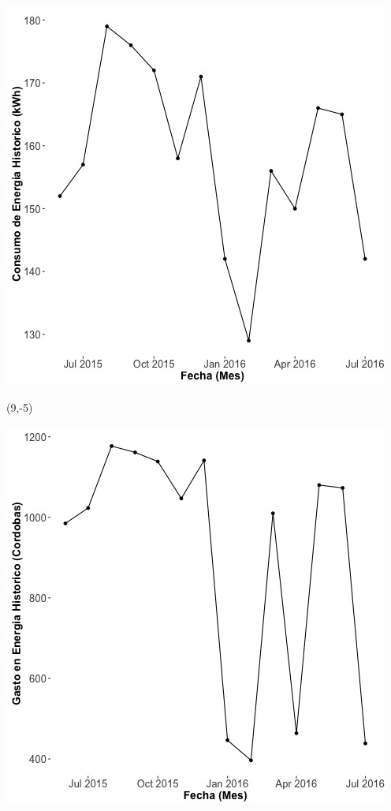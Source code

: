 \documentclass{article}\usepackage[]{graphicx}\usepackage[]{color}
\newenvironment{knitrout}{}{} %
\begin{document}
\begin{knitrout}
\color{fgcolor}
\includegraphics[scale=0.65]{figure/A20_historico_energia} 
\end{knitrout}

 \begin{textblock}{1}(9,-5)
\begin{minipage}{20em}
\begingroup

\endgroup
\end{minipage}
\end{textblock}

\begin{knitrout}
\color{fgcolor}
\includegraphics[scale=0.65]{figure/A20_historico_cordobas} 
\end{knitrout}
\end{document}
